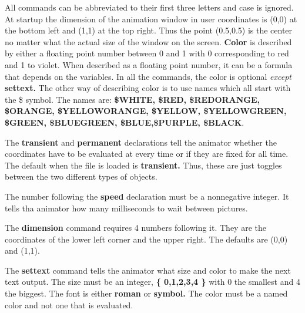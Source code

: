 \documentclass{article}
\begin{document}
All commands can be abbreviated to their first three letters and case
is ignored. At startup the dimension of the animation window in user
coordinates is (0,0) at the bottom left and (1,1) at the top
right. Thus the point (0.5,0.5) is the center no matter what the
actual size of the window on the screen.  {\bf Color} is described by either
a floating point number between 0 and 1 with 0 corresponding to red
and 1 to violet. When described as a floating point number, it can be
a formula that depends on the variables. In all the commands, the
color is optional {\em except} {\bf settext.}  The other way of
describing color is to use names which all start with the \$
symbol. The names are:
{\bf \$WHITE, \$RED, \$REDORANGE, \$ORANGE, \$YELLOWORANGE,
                    \$YELLOW, \$YELLOWGREEN, \$GREEN, \$BLUEGREEN,
		      \$BLUE,\$PURPLE, \$BLACK}.

The {\bf transient} and {\bf permanent} declarations tell the animator
whether the coordinates have to be evaluated at every time or if they
are fixed for all time.  The default when the file is loaded is {\bf
transient.}  Thus, these are just toggles between the two different
types of objects. 

The number following the {\bf speed} declaration must be a nonnegative
integer. It tells tha animator how many milliseconds to wait between
pictures. 

The {\bf dimension} command requires 4 numbers following it. They are
the coordinates of the lower left corner and the upper right. The
defaults are (0,0) and (1,1).  

The {\bf settext} command tells the animator what size and color to
make the next text output. The size must be an integer, {\bf \{
0,1,2,3,4 \} } with 0 the smallest and 4 the biggest. The font is
either {\bf roman} or {\bf symbol.}  The color must be a named color
and not one that is evaluated. 
\end{document}
